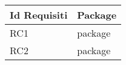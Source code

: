 \begin{center}
	\begin{longtable}{|p{3cm}|p{10cm}|}\hline
		Id Requisiti & Package \\ \hline
		RC1 & package\newline \\ \hline
		RC2 & package\newline \\ \hline
	\end{longtable}
\end{center}
